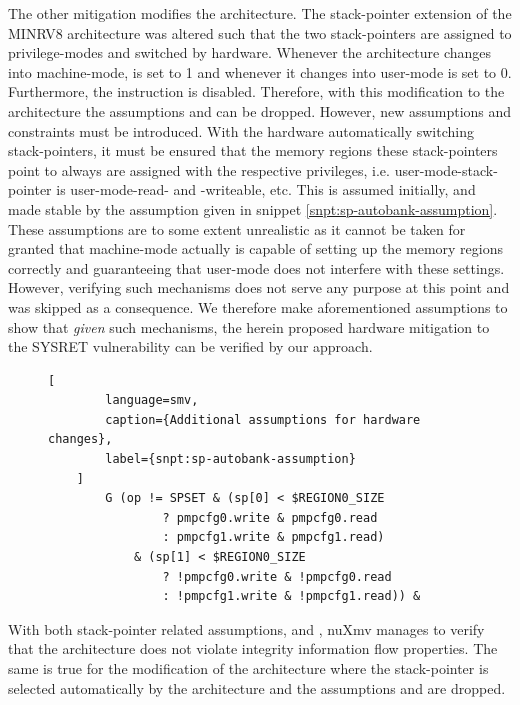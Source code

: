 The other mitigation modifies the architecture.
The stack-pointer extension of the MINRV8 architecture was altered such that the two stack-pointers are assigned to privilege-modes and switched by hardware.
Whenever the architecture changes into machine-mode,  is set to 1 and whenever it changes into user-mode  is set to 0.
Furthermore, the  instruction is disabled.
Therefore, with this modification to the architecture the assumptions  and  can be dropped.
However, new assumptions and  constraints must be introduced.
With the hardware automatically switching stack-pointers, it must be ensured that the memory regions these stack-pointers point to always are assigned with the respective privileges, i.e. user-mode-stack-pointer is user-mode-read- and -writeable, etc.
This is assumed initially, and made stable by the assumption given in snippet \ref{snpt:sp-autobank-assumption}.
These assumptions are to some extent unrealistic as it cannot be taken for granted that machine-mode actually is capable of setting up the memory regions correctly and guaranteeing that user-mode does not interfere with these settings.
However, verifying such mechanisms does not serve any purpose at this point and was skipped as a consequence.
We therefore make aforementioned assumptions to show that \textit{given} such mechanisms, the herein proposed hardware mitigation to the SYSRET vulnerability can be verified by our approach.

\begin{figure}
    \begin{lstlisting}[
        language=smv,
        caption={Additional assumptions for hardware changes},
        label={snpt:sp-autobank-assumption}
    ]
        G (op != SPSET & (sp[0] < $REGION0_SIZE
                ? pmpcfg0.write & pmpcfg0.read
                : pmpcfg1.write & pmpcfg1.read)
            & (sp[1] < $REGION0_SIZE
                ? !pmpcfg0.write & !pmpcfg0.read
                : !pmpcfg1.write & !pmpcfg1.read)) &
    \end{lstlisting}
\end{figure}

With both stack-pointer related assumptions,  and , nuXmv manages to verify that the architecture does not violate integrity information flow properties.
The same is true for the modification of the architecture where the stack-pointer is selected automatically by the architecture and the assumptions  and  are dropped.

